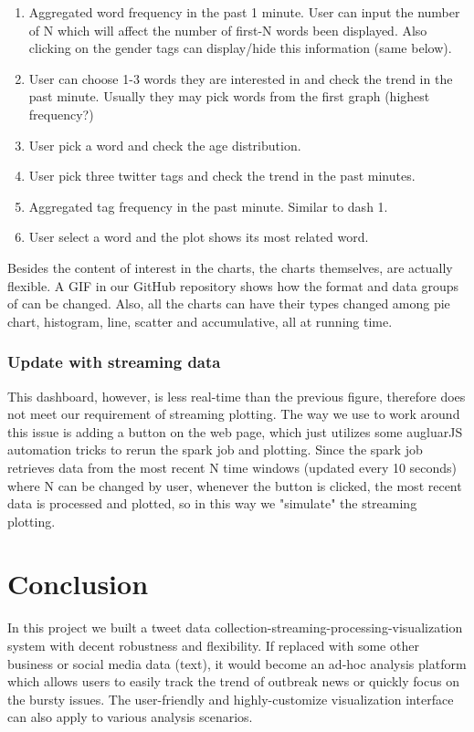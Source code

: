 \documentclass[manuscript, review, screen]{acmart}
\begin{document}
\begin{enumerate}
    \item Aggregated word frequency in the past 1 minute. User can input the number of N which will affect the number of first-N words been displayed. Also clicking on the gender tags can display/hide this information (same below).
    \item User can choose 1-3 words they are interested in and check the trend in the past minute. Usually they may pick words from the first graph (highest frequency?)
    \item User pick a word and check the age distribution.
    \item User pick three twitter tags and check the trend in the past minutes.
    \item Aggregated tag frequency in the past minute. Similar to dash 1.
    \item User select a word and the plot shows its most related word.
\end{enumerate}

Besides the content of interest in the charts, the charts themselves, are actually flexible. A GIF in our GitHub repository shows how the format and data groups of can be changed. Also, all the charts can have their types changed among pie chart, histogram, line, scatter and accumulative, all at running time.

\subsubsection{Update with streaming data}
This dashboard, however, is less real-time than the previous figure, therefore does not meet our requirement of streaming plotting. The way we use to work around this issue is adding a button on the web page, which just utilizes some augluarJS automation tricks to rerun the spark job and plotting. Since the spark job retrieves data from the most recent N time windows (updated every 10 seconds) where N can be changed by user, whenever the button is clicked, the most recent data is processed and plotted, so in this way we "simulate" the streaming plotting.

\section{Conclusion}
In this project we built a tweet data collection-streaming-processing-visualization system with decent robustness and flexibility. If replaced with some other business or social media data (text), it would become an ad-hoc analysis platform which allows users to easily track the trend of outbreak news or quickly focus on the bursty issues. The user-friendly and highly-customize visualization interface can also apply to various analysis scenarios. 
\end{document}
